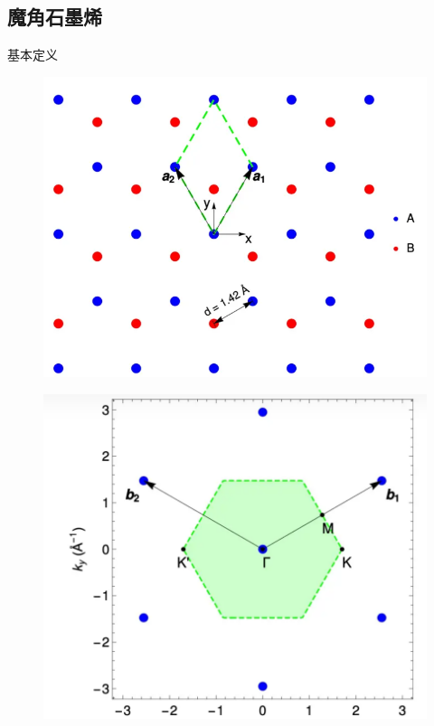 \documentclass{beamer}
\begin{document}
\subsection{魔角石墨烯}
\begin{frame}{基本定义}
 	\begin{minipage}{0.5\textwidth}
		\begin{figure}
			\centering
			\includegraphics[width=\textwidth]{pic/gra.png}
		\end{figure}
	\end{minipage}%
	\begin{minipage}{0.5\textwidth}
		\begin{figure}
			\centering
			\includegraphics[width=\textwidth]{pic/grar.png}
		\end{figure}
	\end{minipage}
\end{frame}
\end{document}
